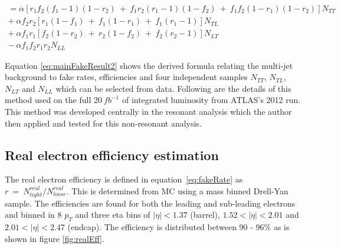 \begin{equation} \label{eq:mainFakeResult2}
\begin{aligned}
   =\alpha[r_{1}f_{2}(f_{1}-1)(1-r_{2})~+~f_{1}r_{2}(r_{1}-1)(1-f_{2})~+~f_{1}f_{2}(1-r_{1})(1-r_{2})]N_{TT} \\
   +~\alpha f_{2}r_{2}[r_{1}(1-f_{1})~+~f_{1}(1-r_{1})~+~f_{1}(r_{1}-1)]N_{TL} \\
   +~\alpha f_{1}r_{1}[f_{2}(1-r_{2})~+~r_{2}(1-f_{2})~+~f_{2}(r_{2}-1)]N_{LT} \\
   -~\alpha f_{1}f_{2}r_{1}r_{2}N_{LL}
\end{aligned}
\end{equation}

Equation \ref{eq:mainFakeResult2} shows the derived formula relating the multi-jet background to fake rates, efficiencies and four independent samples $N_{TT}$, $N_{TL}$, $N_{LT}$ and $N_{LL}$ which can be selected from data. Following are the details of this method used on the full $20~fb^{-1}$ of integrated luminosity from ATLAS's 2012 run. This method was developed centrally in the resonant analysis which the author then applied and tested for this non-resonant analysis.


\subsection{Real electron efficiency estimation}

The real electron efficiency is defined in equation~\ref{eq:fakeRate} as $r~=~N^{real}_{tight}/N^{real}_{loose}$. This is determined from MC using a mass binned Drell-Yan sample. The efficiencies are found for both the leading and sub-leading electrons and binned in 8 $p_{T}$ and three eta bins of $|\eta|<1.37$ (barrel), $1.52<|\eta|<2.01$ and $2.01<|\eta|<2.47$ (endcap). The efficiency is distributed between $90$ - $96\%$ as is shown in figure \ref{fig:realEff}.

